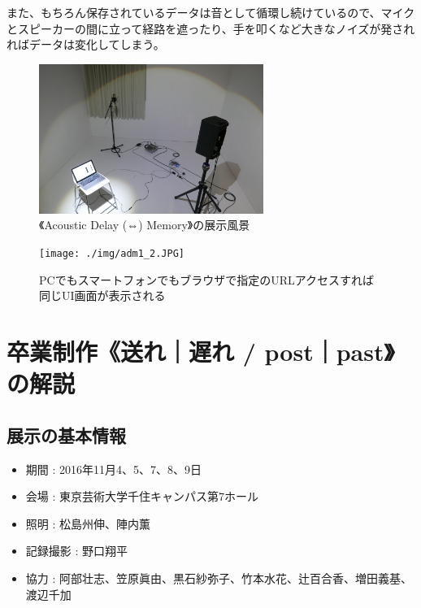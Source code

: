 \documentclass[a4paper,report]{jsbook}
\begin{document}
また、もちろん保存されているデータは音として循環し続けているので、マイクとスピーカーの間に立って経路を遮ったり、手を叩くなど大きなノイズが発されればデータは変化してしまう。

\begin{no-prefix-figure-caption}

\begin{figure}[htbp]
\centering
\includegraphics[width=0.65000\textwidth]{./img/adm1_1.JPG}
\caption{《Acoustic Delay (⇔) Memory》の展示風景}
\end{figure}

\end{no-prefix-figure-caption}

\begin{no-prefix-figure-caption}

\begin{figure}[htbp]
\centering
\texttt{[image: ./img/adm1\_2.JPG]}
\caption{PCでもスマートフォンでもブラウザで指定のURLアクセスすれば同じUI画面が表示される}
\end{figure}

\end{no-prefix-figure-caption}

\section{卒業制作《送れ｜遅れ /
post｜past》の解説}\label{ux5352ux696dux5236ux4f5cux9001ux308cux9045ux308c-postpastux306eux89e3ux8aac}

\subsection{展示の基本情報}\label{ux5c55ux793aux306eux57faux672cux60c5ux5831-1}

\begin{itemize}
\tightlist
\item
  期間 : 2016年11月4、5、7、8、9日
\item
  会場 : 東京芸術大学千住キャンパス第7ホール
\item
  照明 : 松島州伸、陣内薫
\item
  記録撮影 : 野口翔平
\item
  協力 :
  阿部壮志、笠原眞由、黒石紗弥子、竹本水花、辻百合香、増田義基、渡辺千加
\end{itemize}
\end{document}
